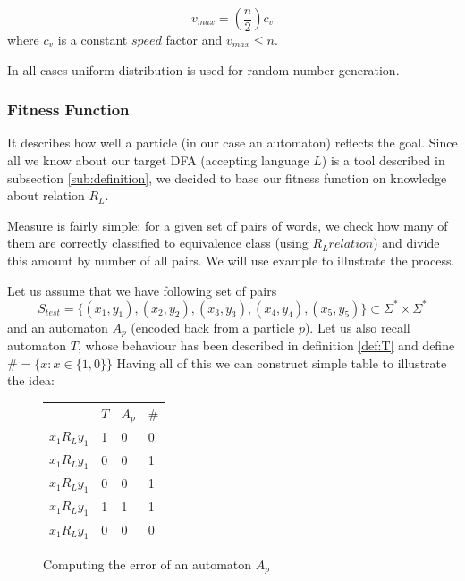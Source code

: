 \documentclass[runningheads, a4paper]{llncs}
\begin{document}
\begin{equation}
	v_{max} = (\frac{n}{2})c_{v}
\end{equation}
where $c_{v}$ is a constant $speed$ factor and $v_{max} \leq n$.

In all cases uniform distribution is used for random number generation.

\subsubsection{Fitness Function}\label{sec:fitness}
It describes how well a particle (in our case an automaton) reflects the goal. Since all we know about our target DFA (accepting language $L$) is a tool described in subsection \ref{sub:definition}, we decided to base our fitness function on knowledge about relation $R_{L}$. 

Measure is fairly simple: for a given set of pairs of words, we check how many of them are correctly classified to equivalence class (using $R_{L} relation$) and divide this amount by number of all pairs. We will use example to illustrate the process.

\begin{example}\label{ex:fitness}


Let us assume that we have following set of pairs
\[
S_{test} = \{(x_1,y_1), (x_2,y_2), (x_3, y_3), (x_4, y_4), (x_5, y_5)\} \subset \Sigma^{*}\times\Sigma^{*} 
\]
and an automaton $A_p$ (encoded back from a particle $p$).
Let us also recall automaton $T$, whose behaviour has been described in definition \ref{def:T} and define $\# = \{ x : x \in \{1 ,0 \}\}$  Having all of this we can construct simple table to illustrate the idea:

\begin{figure}[H]
\begin{center}
\begin{tabular}{ m{4.5em}  m{3em}  m{3em}  m{3em} }
                 & $T$ & $A_p$ & $\#$ \\  
 $x_1 R_{L} y_1$ & 1 & 0 & 0 \\   
 $x_1 R_{L} y_1$ & 0 & 0 & 1 \\   
 $x_1 R_{L} y_1$ & 0 & 0 & 1 \\   
 $x_1 R_{L} y_1$ & 1 & 1 & 1 \\   
 $x_1 R_{L} y_1$ & 0 & 0 & 0 \\   
\end{tabular}
\caption{Computing the error of an automaton $A_p$}
\label{fig:fitness_table}
\end{center}
\end{figure}

\end{example}
\end{document}
